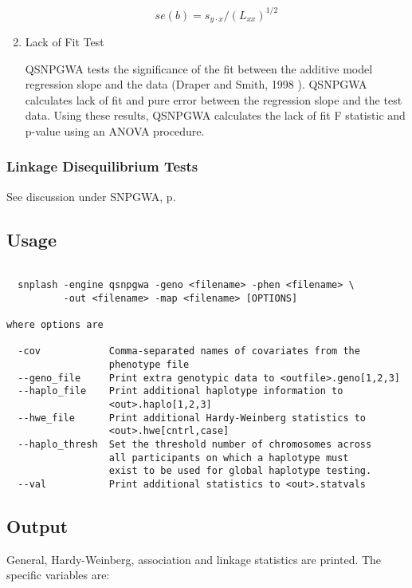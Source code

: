 \begin{enumerate}
    \begin{equation*}
      se(b) = s_{y\cdot{}x}/\left(L_{xx}\right)^{1/2}
    \end{equation*}

  \item{Lack of Fit Test}
    
    QSNPGWA tests the significance of the fit between the additive model
    regression slope and the data (Draper and Smith, 1998 \cite{Draper98}).
    QSNPGWA calculates lack of fit and pure error between the regression slope
    and the test data.  Using these results, QSNPGWA calculates the lack of fit
    F statistic and p-value using an ANOVA procedure.

\end{enumerate}

\subsubsection{Linkage Disequilibrium Tests}
See discussion under SNPGWA, p.\pageref{sec:linkage-dis}

\subsection{Usage}
\begin{verbatim}

  snplash -engine qsnpgwa -geno <filename> -phen <filename> \
          -out <filename> -map <filename> [OPTIONS]

where options are

  -cov            Comma-separated names of covariates from the
                  phenotype file
  --geno_file     Print extra genotypic data to <outfile>.geno[1,2,3]
  --haplo_file    Print additional haplotype information to
                  <out>.haplo[1,2,3]
  --hwe_file      Print additional Hardy-Weinberg statistics to
                  <out>.hwe[cntrl,case]
  --haplo_thresh  Set the threshold number of chromosomes across
                  all participants on which a haplotype must 
                  exist to be used for global haplotype testing.
  --val           Print additional statistics to <out>.statvals

\end{verbatim}

\subsection{Output}
General, Hardy-Weinberg, association and linkage statistics are printed.  The
specific  variables are:

